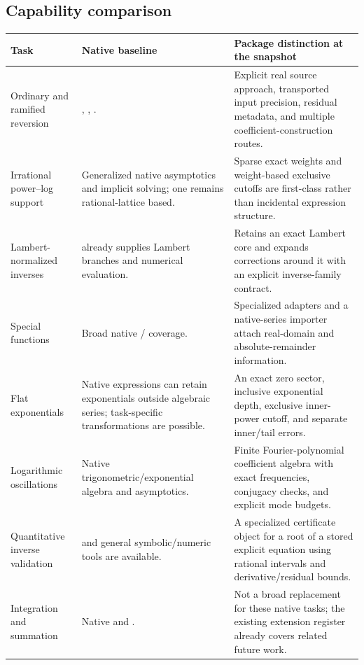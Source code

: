\subsection{Capability comparison}

\begin{longtable}{@{}R{0.22\textwidth}R{0.34\textwidth}R{0.36\textwidth}@{}}
\toprule
Task & Native baseline & Package distinction at the snapshot\\\midrule\endhead
Ordinary and ramified reversion & , , . & Explicit real source approach, transported input precision, residual metadata, and multiple coefficient-construction routes.\\[0.6em]
Irrational power--log support & Generalized native asymptotics and implicit solving; one  remains rational-lattice based. & Sparse exact weights and weight-based exclusive cutoffs are first-class rather than incidental expression structure.\\[0.6em]
Lambert-normalized inverses &  already supplies Lambert branches and numerical evaluation. & Retains an exact Lambert core and expands corrections around it with an explicit inverse-family contract.\\[0.6em]
Special functions & Broad native / coverage. & Specialized adapters and a native-series importer attach real-domain and absolute-remainder information.\\[0.6em]
Flat exponentials & Native expressions can retain exponentials outside algebraic series; task-specific transformations are possible. & An exact zero sector, inclusive exponential depth, exclusive inner-power cutoff, and separate inner/tail errors.\\[0.6em]
Logarithmic oscillations & Native trigonometric/exponential algebra and asymptotics. & Finite Fourier-polynomial coefficient algebra with exact frequencies, conjugacy checks, and explicit mode budgets.\\[0.6em]
Quantitative inverse validation &  and general symbolic/numeric tools are available. & A specialized certificate object for a root of a stored explicit equation using rational intervals and derivative/residual bounds.\\[0.6em]
Integration and summation & Native  and . & Not a broad replacement for these native tasks; the existing extension register already covers related future work.\\
\bottomrule
\end{longtable}

